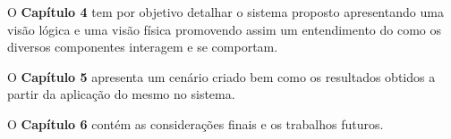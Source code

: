 O \textbf{Capítulo 4} tem por objetivo detalhar o sistema proposto apresentando uma visão lógica e uma visão física promovendo assim um entendimento do como os diversos componentes interagem e se comportam.

O \textbf{Capítulo 5} apresenta um cenário criado bem como os resultados obtidos a partir da aplicação do mesmo no sistema.

O \textbf{Capítulo 6} contém as considerações finais e os trabalhos futuros.

	


